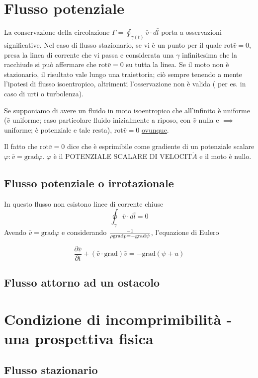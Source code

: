 \documentclass[a4paper,11pt]{report}
\newcommand{\vel}{\bar{v}}
\begin{document}
	\section{Flusso potenziale}
	La conservazione della circolazione $\Gamma = \oint_{\gamma(t)} \vel \cdot d\bar{l}$ porta a osservazioni significative.
	Nel caso di flusso stazionario, se vi è un punto per  il quale $\mathrm{rot}\vel = 0$, presa la linea di corrente che vi passa e considerata una $\gamma$ infinitesima che la racchiude si può affermare che $\mathrm{rot}\vel =0$ su tutta la linea.
	Se il moto non è stazionario, il risultato vale lungo una traiettoria; ciò sempre tenendo a mente l'ipotesi di flusso isoentropico, altrimenti l'osservazione non è valida ( per es. in caso di urti o turbolenza).
	
	Se supponiamo di avere un fluido in moto isoentropico che all'infinito è uniforme ($\vel$ uniforme; caso particolare fluido inizialmente a riposo, con $\vel$ nulla e $\implies$ uniforme; è potenziale e tale resta), $\mathrm{rot}\vel =0$ \underline{ovunque}.
	
	Il fatto che $\mathrm{rot}\vel =0$ dice che è esprimibile come gradiente di un potenziale scalare $\varphi : \vel = \mathrm{grad}\varphi$.
	$\varphi$ è il POTENZIALE SCALARE DI VELOCIT$\grave{A}$ e il moto è nullo.
	
	\subsection{Flusso potenziale o irrotazionale}
	
	In questo flusso non esistono linee di corrente chiuse
	$$
	\oint_{\gamma} \vel \cdot d\bar{l} = 0
	$$
	Avendo $\vel = \mathrm{grad}\varphi $ e considerando $- 1\over \rho \mathrm{grad}p = - \mathrm{grad}\psi$, l'equazione di Eulero
	
	$$
	\dfrac{\partial \vel}{\partial t} + \left(\vel \cdot \mathrm{grad}\right)\vel = -\mathrm{grad}\left(\psi + u\right)
	$$
	
		\subsection{Flusso attorno ad un ostacolo}
				
	\section{Condizione di incomprimibilità - una prospettiva fisica}
		\subsection{Flusso stazionario}				
\end{document}
